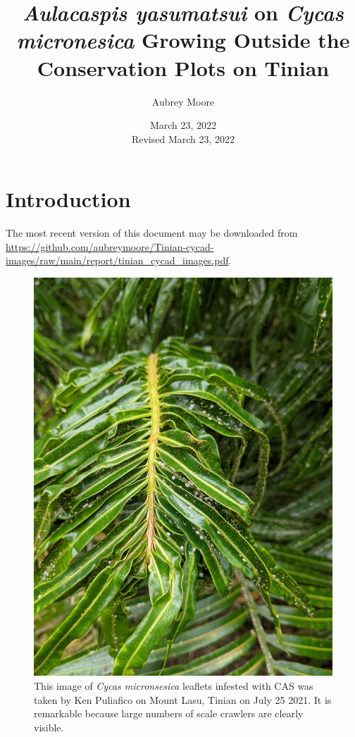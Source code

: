 \documentclass[12pt,letterpaper,english,bibliography=totocnumbered, abstract=on]{scrartcl}
\begin{document}
\titlehead{Technical Report}

\title{\textit{Aulacaspis yasumatsui} on \textit{Cycas micronesica} Growing Outside the Conservation Plots on Tinian}

\author{Aubrey Moore}

\date{March 23, 2022\\Revised March 23, 2022}

\maketitle
\newpage
\tableofcontents

\pagebreak

\section{Introduction}

The most recent version of this document may be downloaded from \url{https://github.com/aubreymoore/Tinian-cycad-images/raw/main/report/tinian_cycad_images.pdf}.

\begin{figure}[h]
	\centering
	\includegraphics[width=1\linewidth]{../images/PXL_20210725_040405506}
	\caption{This image of \textit{Cycas micronsesica} leaflets infested with CAS was taken by Ken Puliafico on Mount Lasu, Tinian on July 25 2021. It is remarkable because large numbers of scale crawlers are clearly visible.}
	\label{fig:crawlers}
\end{figure}
\end{document}

